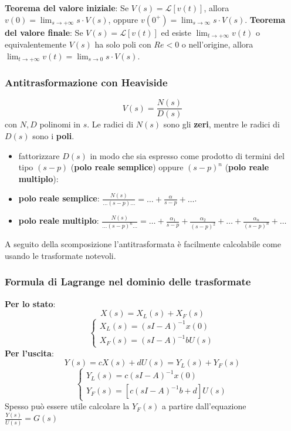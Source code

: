 \begin{landscape}
\begin{multicols*}{3}
    \newline
    \textbf{Teorema del valore iniziale}:\newline
    Se $V(s) = \mathcal{L}[v(t)]$, allora $v(0) = \lim_{s\rightarrow +\infty} s \cdot V(s)$, oppure $v(0^+) = \lim_{s\rightarrow \infty}s \cdot V(s)$.\newline
    \newline
    \textbf{Teorema del valore finale}:\newline
    Se $V(s) = \mathcal{L}[v(t)]$ ed esiste $\lim_{t\rightarrow +\infty} v(t)$ o equivalentemente $V(s)$ ha solo poli con $Re< 0$ o nell'origine, allora $\lim_{t\rightarrow +\infty} v(t) = \lim_{s\rightarrow 0} s \cdot V(s)$.
    \subsubsection*{Antitrasformazione con Heaviside}
    \[
        V(s) = \frac{N(s)}{D(s)}
    \]
    con $N,D$ polinomi in $s$.\newline
    Le radici di $N(s)$ sono gli \textbf{zeri}, mentre le radici di $D(s)$ sono i \textbf{poli}.\newline
    \begin{itemize}
        \item fattorizzare $D(s)$ in modo che sia espresso come prodotto di termini del tipo $(s-p)$ (\textbf{polo reale semplice}) oppure $(s-p)^n$ (\textbf{polo reale multiplo}):
        \item \textbf{polo reale semplice}: $\frac{N(s)}{\dots(s-p)\dots} = \dots + \frac{\alpha}{s-p} + \dots$.
        \item \textbf{polo reale multiplo}: $\frac{N(s)}{\dots (s-p)^n \dots} = \dots + \frac{\alpha_1}{s-p} + \frac{\alpha_2}{(s-p)^2} + \dots + \frac{\alpha_n}{(s-p)^n} + \dots$
    \end{itemize}
    A seguito della scomposizione l'antitrasformata è facilmente calcolabile come usando le trasformate notevoli.
    \subsubsection*{Formula di Lagrange nel dominio delle trasformate}
    \textbf{Per lo stato}:
    \[
        X(s) = X_L(s) + X_F(s)
    \]
    \[
        \begin{cases}
            X_L(s) = (sI-A)^{-1} x(0)\\
            X_F(s) = (sI-A) ^{-1} b U(s)
        \end{cases}
    \]
    \textbf{Per l'uscita}:
    \[
        Y(s) = cX(s) + dU(s) = Y_L(s) + Y_F(s)
    \]
    \[
        \begin{cases}
            Y_L(s) = c(sI-A)^{-1} x(0)\\
            Y_F(s) = [c(sI-A)^{-1} b + d]U(s)
        \end{cases}
    \]
    Spesso può essere utile calcolare la $Y_F(s)$ a partire dall'equazione $\frac{Y(s)}{U(s)} = G(s)$

\end{multicols*}
\end{landscape}

